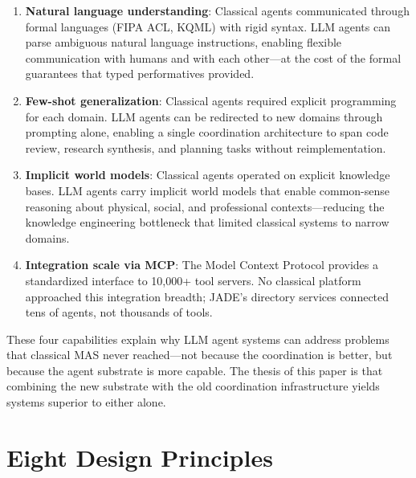 \documentclass{article}
\begin{document}
\begin{enumerate}[nosep]
  \item \textbf{Natural language understanding}: Classical agents communicated through
    formal languages (FIPA ACL, KQML) with rigid syntax. LLM agents can parse
    ambiguous natural language instructions, enabling flexible communication with humans
    and with each other---at the cost of the formal guarantees that typed performatives
    provided.
  \item \textbf{Few-shot generalization}: Classical agents required explicit programming
    for each domain. LLM agents can be redirected to new domains through prompting alone,
    enabling a single coordination architecture to span code review, research synthesis,
    and planning tasks without reimplementation.
  \item \textbf{Implicit world models}: Classical agents operated on explicit knowledge
    bases. LLM agents carry implicit world models that enable common-sense reasoning
    about physical, social, and professional contexts---reducing the knowledge
    engineering bottleneck that limited classical systems to narrow domains.
  \item \textbf{Integration scale via MCP}: The Model Context Protocol provides a
    standardized interface to 10,000+ tool servers. No classical platform approached
    this integration breadth; JADE's directory services connected tens of agents, not
    thousands of tools.
\end{enumerate}

\noindent
These four capabilities explain why LLM agent systems can address problems that
classical MAS never reached---not because the coordination is better, but because the
agent substrate is more capable. The thesis of this paper is that combining the new
substrate with the old coordination infrastructure yields systems superior to either
alone.


%
\section{Eight Design Principles}
\label{sec:principles}
\end{document}
